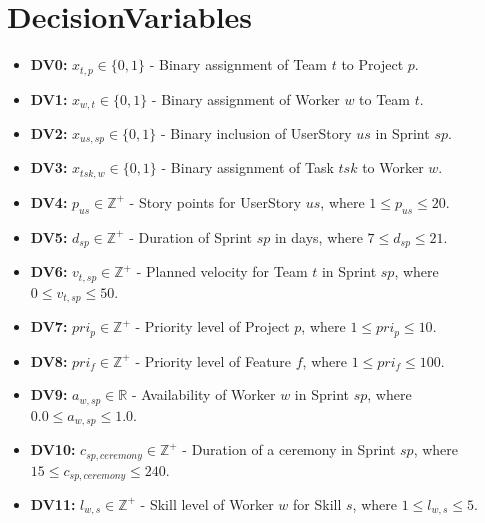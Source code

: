 \documentclass[11pt]{article}
\begin{document}
\section{DecisionVariables}
\begin{itemize}
    \item \textbf{DV0:} $x_{t,p} \in \{0, 1\}$ - Binary assignment of Team $t$ to Project $p$.
    \item \textbf{DV1:} $x_{w,t} \in \{0, 1\}$ - Binary assignment of Worker $w$ to Team $t$.
    \item \textbf{DV2:} $x_{us,sp} \in \{0, 1\}$ - Binary inclusion of UserStory $us$ in Sprint $sp$.
    \item \textbf{DV3:} $x_{tsk,w} \in \{0, 1\}$ - Binary assignment of Task $tsk$ to Worker $w$.
    \item \textbf{DV4:} $p_{us} \in \mathbb{Z}^+$ - Story points for UserStory $us$, where $1 \leq p_{us} \leq 20$.
    \item \textbf{DV5:} $d_{sp} \in \mathbb{Z}^+$ - Duration of Sprint $sp$ in days, where $7 \leq d_{sp} \leq 21$.
    \item \textbf{DV6:} $v_{t,sp} \in \mathbb{Z}^+$ - Planned velocity for Team $t$ in Sprint $sp$, where $0 \leq v_{t,sp} \leq 50$.
    \item \textbf{DV7:} $pri_p \in \mathbb{Z}^+$ - Priority level of Project $p$, where $1 \leq pri_p \leq 10$.
    \item \textbf{DV8:} $pri_f \in \mathbb{Z}^+$ - Priority level of Feature $f$, where $1 \leq pri_f \leq 100$.
    \item \textbf{DV9:} $a_{w,sp} \in \mathbb{R}$ - Availability of Worker $w$ in Sprint $sp$, where $0.0 \leq a_{w,sp} \leq 1.0$.
    \item \textbf{DV10:} $c_{sp, ceremony} \in \mathbb{Z}^+$ - Duration of a ceremony in Sprint $sp$, where $15 \leq c_{sp, ceremony} \leq 240$.
    \item \textbf{DV11:} $l_{w,s} \in \mathbb{Z}^+$ - Skill level of Worker $w$ for Skill $s$, where $1 \leq l_{w,s} \leq 5$.
\end{itemize}
\end{document}
